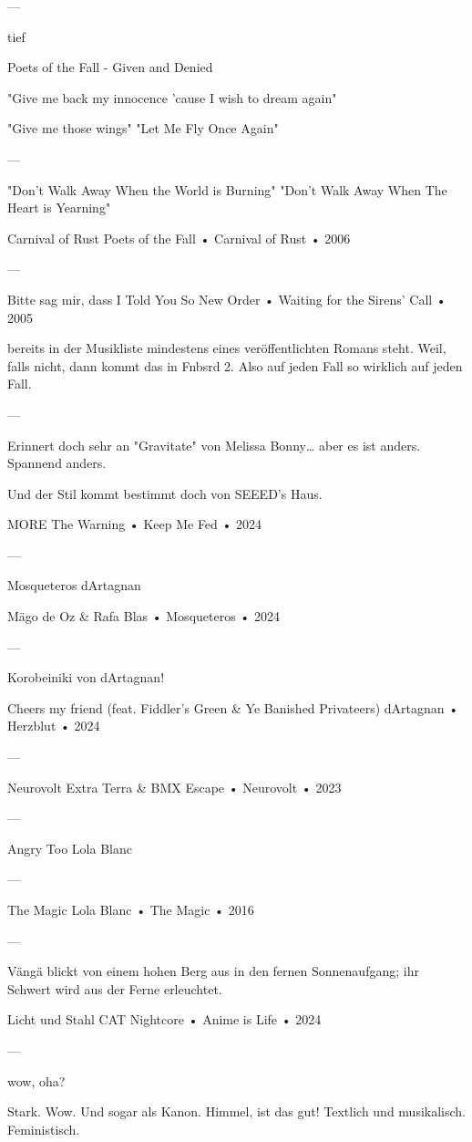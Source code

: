 —

tief

Poets of the Fall - Given and Denied

"Give me back my innocence 'cause I wish to dream again"

"Give me those wings"
"Let Me Fly Once Again"

—

"Don't Walk Away When the World is Burning"
"Don't Walk Away When The Heart is Yearning"

Carnival of Rust
Poets of the Fall
 •
Carnival of Rust
 •
2006

—

Bitte sag mir, dass
I Told You So
New Order
 •
Waiting for the Sirens' Call
 •
2005

bereits in der Musikliste mindestens eines veröffentlichten Romans steht.
Weil, falls nicht, dann kommt das in Fnbsrd 2.
Also
auf jeden Fall
so wirklich
auf jeden Fall.

—

Erinnert doch sehr an "Gravitate" von Melissa Bonny… aber es ist anders.
Spannend anders.

Und der Stil kommt bestimmt doch von SEEED's Haus.

MORE
The Warning
 •
Keep Me Fed
 •
2024

—

Mosqueteros
dArtagnan

Mägo de Oz
 &
Rafa Blas
 •
Mosqueteros
 •
2024

—

Korobeiniki von dArtagnan!

Cheers my friend (feat. Fiddler's Green & Ye Banished Privateers)
dArtagnan
 •
Herzblut
 •
2024


—

Neurovolt
Extra Terra
 &
BMX Escape
 •
Neurovolt
 • 2023

—

Angry Too
Lola Blanc

—

The Magic
Lola Blanc
 •
The Magic
 •
2016

—

Vängä blickt von einem hohen Berg aus in den fernen Sonnenaufgang; ihr Schwert wird aus der Ferne erleuchtet.

Licht und Stahl
CAT Nightcore
 •
Anime is Life
 • 2024


—

wow, oha?

Stark. Wow. Und sogar als Kanon. Himmel, ist das gut! Textlich und musikalisch. Feministisch.

